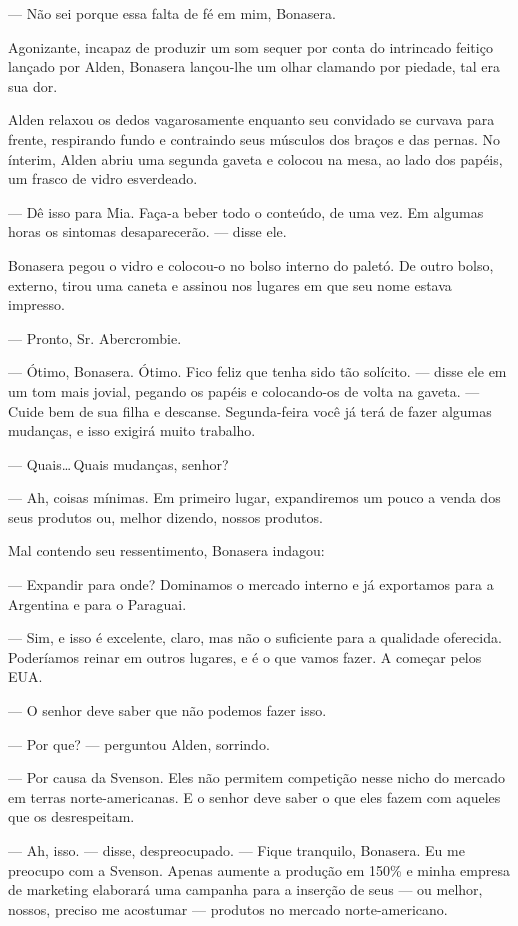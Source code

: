 --- Não sei porque essa falta de fé em mim, Bonasera.

Agonizante, incapaz de produzir um som sequer por conta do intrincado feitiço
lançado por Alden, Bonasera lançou-lhe um olhar clamando por piedade, tal era
sua dor.

Alden relaxou os dedos vagarosamente enquanto seu convidado se curvava para
frente, respirando fundo e contraindo seus músculos dos braços e das pernas. No
ínterim, Alden abriu uma segunda gaveta e colocou na mesa, ao lado dos papéis,
um frasco de vidro esverdeado.

--- Dê isso para Mia. Faça-a beber todo o conteúdo, de uma vez. Em algumas
horas os sintomas desaparecerão. --- disse ele.

Bonasera pegou o vidro e colocou-o no bolso interno do paletó. De outro bolso,
externo, tirou uma caneta e assinou nos lugares em que seu nome estava
impresso.

--- Pronto, Sr. Abercrombie.

--- Ótimo, Bonasera. Ótimo. Fico feliz que tenha sido tão solícito. --- disse
ele em um tom mais jovial, pegando os papéis e colocando-os de volta na gaveta.
--- Cuide bem de sua filha e descanse. Segunda-feira você já terá de fazer
algumas mudanças, e isso exigirá muito trabalho.

--- Quais\ldots\,Quais mudanças, senhor?

--- Ah, coisas mínimas. Em primeiro lugar, expandiremos um pouco a venda dos
seus produtos ou, melhor dizendo, nossos produtos.

Mal contendo seu ressentimento, Bonasera indagou:

--- Expandir para onde? Dominamos o mercado interno e já exportamos para a
Argentina e para o Paraguai.

--- Sim, e isso é excelente, claro, mas não o suficiente para a qualidade
oferecida. Poderíamos reinar em outros lugares, e é o que vamos fazer. A
começar pelos EUA.

--- O senhor deve saber que não podemos fazer isso.

--- Por que? --- perguntou Alden, sorrindo.

--- Por causa da Svenson. Eles não permitem competição nesse nicho do mercado
em terras norte-americanas. E o senhor deve saber o que eles fazem com aqueles
que os desrespeitam.

--- Ah, isso. --- disse, despreocupado. --- Fique tranquilo, Bonasera. Eu me
preocupo com a Svenson. Apenas aumente a produção em 150\% e minha empresa de
marketing elaborará uma campanha para a inserção de seus --- ou melhor, nossos,
preciso me acostumar --- produtos no mercado norte-americano.


